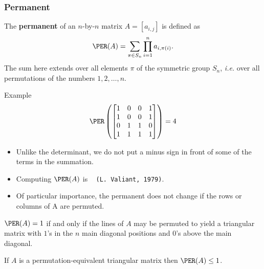 \documentclass[unknownkeysallowed,11pt]{beamer}
\begin{document}
\begin{frame}[fragile]
    \frametitle{Permanent}

    \begin{definition}
      The \textbf{permanent} of an $n$-by-$n$ matrix $A = [a_{i,j}]$ is defined as
      $$
        \PER(A) = \sum_{\pi \in S_n} \prod_{i=1}^{n} a_{i, \pi(i)}\text{.}
      $$
      The sum here extends over all elements $\pi$ of the symmetric group
      $S_n$, \emph{i.e.} over all permutations of the numbers $1, 2, \ldots, n$.
    \end{definition}

    \begin{overprint}
      \begin{exampleblock}{Example}
        $$
        \PER\left(
        \begin{bmatrix}
          1 & 0 & 0 & 1 \\
          1 & 0 & 0 & 1 \\
          0 & 1 & 1 & 0 \\
          1 & 1 & 1 & 1
        \end{bmatrix}
        \right)
        = 4
        $$
      \end{exampleblock}

      \begin{itemize}
        \item
        Unlike the determinant, we do not put a minus sign in front of some of the terms in the
        summation.

        \medskip

        \item
        Computing $\PER(A)$ is \sharpPcomplete~
        \texttt{\small(L.~Valiant, 1979)}.

        \medskip

        \item
        Of particular importance,
        the permanent does not change if the rows or columns of A are permuted.
      \end{itemize}

      \begin{theorem}
      $\PER(A)=1$ if and only if the lines of $A$
      may be permuted to yield a triangular matrix with $1$'s
      in the $n$ main diagonal positions and $0$'s above the main diagonal.
      \end{theorem}

      \begin{theorem}
        If $A$ is a permutation-equivalent triangular matrix
        then $\PER(A) \leq 1$.
      \end{theorem}
    \end{overprint}

\end{frame}
\end{document}
